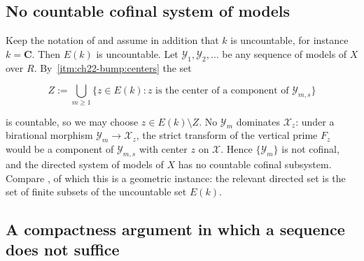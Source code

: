 \subsection{No countable cofinal system of models}

\begin{example}
\label{ex:ch22-no-countable-cofinal}
Keep the notation of  and assume in addition that
$k$ is uncountable, for instance $k=\mathbf C$.  Then $E(k)$ is
uncountable.  Let $\mathcal Y_1,\mathcal Y_2,\ldots$ be any sequence of
models of $X$ over $R$.  By
\,\cref{itm:ch22-bump:centers} the set

\[
 Z:=\bigcup_{m\geq1}\{z\in E(k):
      z\text{ is the center of a component of }\mathcal Y_{m,s}\}
\]

is countable, so we may choose $z\in E(k)\setminus Z$.  No
$\mathcal Y_m$ dominates $\mathcal X_z$: under a birational morphism
$\mathcal Y_m\to\mathcal X_z$, the strict transform of the vertical prime
$F_z$ would be a component of $\mathcal Y_{m,s}$ with center $z$ on
$\mathcal X$.  Hence $\{\mathcal Y_m\}$ is not cofinal, and the directed
system of models of $X$ has no countable cofinal subsystem.  Compare
, of which this is a geometric instance: the
relevant directed set is the set of finite subsets of the uncountable set
$E(k)$.
\end{example}

\subsection{A compactness argument in which a sequence does not suffice}

